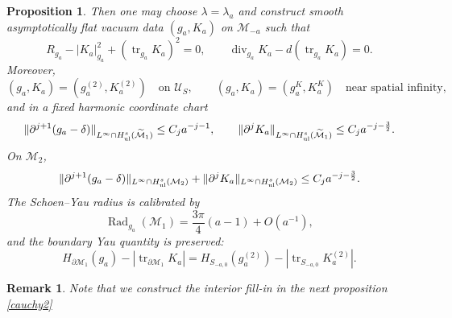 \documentclass{amsart}
\newtheorem{remark}{Remark}
\newtheorem{proposition}{Proposition}[section]
\begin{document}
{\begin{proposition}
\noindent Then one may choose \(\lambda=\lambda_a\) and construct smooth
asymptotically flat vacuum data \((g_a,K_a)\) on \(\mathcal M_{-a}\) such
that
\[
        R_{g_a}-|K_a|_{g_a}^{2}+(\operatorname{tr}_{g_a}K_a)^2=0,
        \qquad
        \operatorname{div}_{g_a}K_a-d(\operatorname{tr}_{g_a}K_a)=0.
\]
Moreover,
\[
        (g_a,K_a)=(g_a^{(2)},K_a^{(2)})\quad\text{on }\mathcal U_S,
        \qquad
        (g_a,K_a)=(g_a^K,K_a^K)\quad\text{near spatial infinity},
\]
and in a fixed harmonic coordinate chart
\[
        \|\partial^{j+1}(g_a-\delta)\|_{L^\infty\cap H^s_{\rm ul}(\widetilde{\mathcal M}_1)}
        \le C_j a^{-j-1},
        \qquad
        \|\partial^jK_a\|_{L^\infty\cap H^s_{\rm ul}(\widetilde{\mathcal M}_1)}
        \le C_j a^{-j-\frac32}.
\]
On \(\mathcal M_2\),
\[
        \|\partial^{j+1}(g_a-\delta)\|_{L^\infty\cap H^s_{\rm ul}(\mathcal M_2)}
        +
        \|\partial^jK_a\|_{L^\infty\cap H^s_{\rm ul}(\mathcal M_2)}
        \le C_j a^{-j-\frac32}.
\]
The Schoen--Yau radius is calibrated by
\[
        \operatorname{Rad}_{g_a}(\mathcal M_1)
        =
        \frac{3\pi}{4}(a-1)+O(a^{-1}),
\]
and the boundary Yau quantity is preserved:
\[
        H_{\partial\mathcal M_1}(g_a)
        -
        \left|\operatorname{tr}_{\partial\mathcal M_1}K_a\right|
        =
        H_{S_{-a,0}}(g_a^{(2)})
        -
        \left|\operatorname{tr}_{S_{-a,0}}K_a^{(2)}\right|.
\]
\end{proposition}
\begin{remark}
Note that we construct the interior fill-in in the next proposition \ref{cauchy2}
\end{remark}

}
\end{document}
